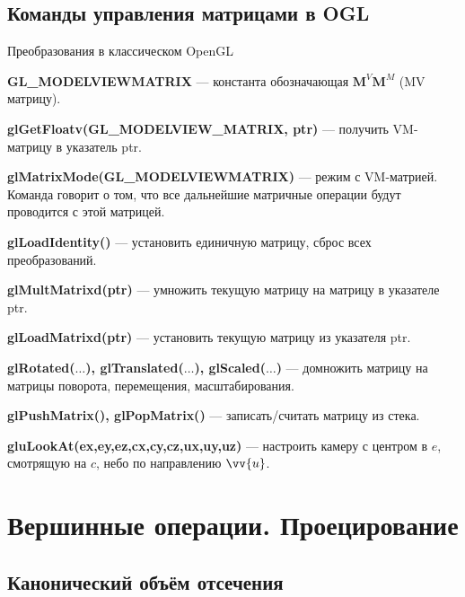 \documentclass[10pt]{beamer}
\begin{document}
	\subsection{Команды управления матрицами в OGL}
	
	\begin{frame}{Преобразования в классическом OpenGL}
		
		\textbf{GL\_MODELVIEWMATRIX} --- константа обозначающая $\mathbf M^V \mathbf M^M$ (MV матрицу).
		
		\textbf{glGetFloatv(GL\_MODELVIEW\_MATRIX, ptr)} --- получить VM-матрицу в указатель ptr.
		
		\textbf{glMatrixMode(GL\_MODELVIEWMATRIX)} --- режим с VM-матрией. Команда говорит о том, что все дальнейшие матричные операции будут проводится с этой матрицей.
		
		\textbf{glLoadIdentity()}  --- установить единичную матрицу, сброс всех преобразований.
		
		\textbf{glMultMatrixd(ptr)} --- умножить текущую матрицу на матрицу в указателе ptr.
		
		\textbf{glLoadMatrixd(ptr)} --- установить текущую матрицу из указателя ptr.
		
		\textbf{glRotated($\dots$), glTranslated($\dots$), glScaled($\dots$)}  --- домножить матрицу на матрицы поворота, перемещения, масштабирования.
		
		\textbf{glPushMatrix(), glPopMatrix() }--- записать/считать матрицу из стека.
		
		\textbf{gluLookAt(ex,ey,ez,cx,cy,cz,ux,uy,uz)} --- настроить камеру с центром в $e$, смотрящую на $c$, небо по направлению $\vv{u}$.		
		
	\end{frame}
	
	\section{Вершинные операции. Проецирование}
	
	\frame {\sectionpage}
	
	\subsection{Канонический объём отсечения}
	
\end{document}
